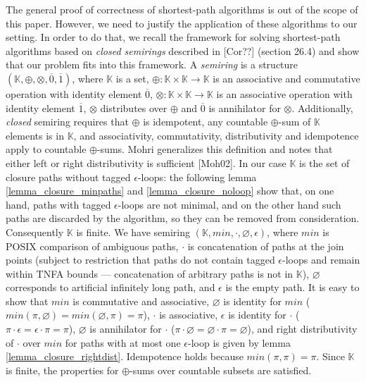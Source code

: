 \documentclass[AMA,STIX1COL]{WileyNJD-v2}
\newcommand{\YK}{\mathbb{K}}
\newcommand*{\Xbar}[1]{\overline{#1}}
\begin{document}
The general proof of correctness of shortest-path algorithms is out of the scope of this paper.
However, we need to justify the application of these algorithms to our setting.
%
In order to do that, we recall the framework for solving shortest-path algorithms based on \emph{closed semirings}
described in [Cor??] (section 26.4)
and show that our problem fits into this framework.
%
A \emph{semiring} is a structure $(\YK, \oplus, \otimes, \Xbar{0}, \Xbar{1})$, where
$\YK$ is a set,
$\oplus \!\!:\!\! \YK \times \YK \rightarrow \YK$ is an associative and commutative operation with identity element $\Xbar{0}$,
$\otimes \!\!:\!\! \YK \times \YK \rightarrow \YK$ is an associative operation with identity element $\Xbar{1}$,
$\otimes$ distributes over $\oplus$
and $\Xbar{0}$ is annihilator for $\otimes$.
%
Additionally, \emph{closed} semiring requires that
$\oplus$ is idempotent,
any countable $\oplus$-sum of $\YK$ elements is in $\YK$,
and associativity, commutativity, distributivity and idempotence apply to countable $\oplus$-sums.
Mohri generalizes this definition and notes that either left or right distributivity is sufficient [Moh02].
%
In our case $\YK$ is the set of closure paths without tagged $\epsilon$-loops:
the following lemma \ref{lemma_closure_minpaths} and \ref{lemma_closure_noloop}
show that, on one hand, paths with tagged $\epsilon$-loops are not minimal,
and on the other hand such paths are discarded by the algorithm,
so they can be removed from consideration.
%
Consequently $\YK$ is finite.
We have semiring $(\YK, min, \cdot, \varnothing, \epsilon)$, where
$min$ is POSIX comparison of ambiguous paths,
$\cdot$ is concatenation of paths at the join points
(subject to restriction that paths do not contain tagged $\epsilon$-loops
and remain within TNFA bounds --- concatenation of arbitrary paths is not in $\YK$),
$\varnothing$ corresponds to artificial infinitely long path,
and $\epsilon$ is the empty path.
%
It is easy to show that
$min$ is commutative and associative,
$\varnothing$ is identity for $min$ ($min(\pi, \varnothing) = min(\varnothing, \pi) = \pi$),
$\cdot$ is associative,
$\epsilon$ is identity for $\cdot$ ($\pi \cdot \epsilon = \epsilon \cdot \pi = \pi$),
$\varnothing$ is annihilator for $\cdot$ ($\pi \cdot \varnothing = \varnothing \cdot \pi = \varnothing$),
and right distributivity of $\cdot$ over $min$ for paths with at most one $\epsilon$-loop is given by lemma \ref{lemma_closure_rightdist}.
%
Idempotence holds because $min(\pi, \pi) = \pi$.
%
Since $\YK$ is finite, the properties for $\oplus$-sums over countable subsets are satisfied.
\end{document}
